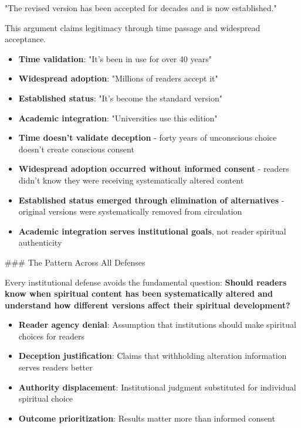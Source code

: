 \documentclass[12pt,twoside]{book}
\begin{document}
"The revised version has been accepted for decades and is now established."

This argument claims legitimacy through time passage and widespread acceptance.

\begin{itemize}
\item \textbf{\textbf{Time validation}}: "It's been in use for over 40 years"
\item \textbf{\textbf{Widespread adoption}}: "Millions of readers accept it"
\item \textbf{\textbf{Established status}}: "It's become the standard version"
\item \textbf{\textbf{Academic integration}}: "Universities use this edition"

\item \textbf{\textbf{Time doesn't validate deception}} - forty years of unconscious choice doesn't create conscious consent
\item \textbf{\textbf{Widespread adoption occurred without informed consent}} - readers didn't know they were receiving systematically altered content
\item \textbf{\textbf{Established status emerged through elimination of alternatives}} - original versions were systematically removed from circulation
\item \textbf{\textbf{Academic integration serves institutional goals}}, not reader spiritual authenticity
\end{itemize}

\#\#\# The Pattern Across All Defenses

Every institutional defense avoids the fundamental question: \textbf{\textbf{\textbf{Should readers know when spiritual content has been systematically altered and understand how different versions affect their spiritual development?}}}

\begin{itemize}
\item \textbf{\textbf{Reader agency denial}}: Assumption that institutions should make spiritual choices for readers
\item \textbf{\textbf{Deception justification}}: Claims that withholding alteration information serves readers better
\item \textbf{\textbf{Authority displacement}}: Institutional judgment substituted for individual spiritual choice
\item \textbf{\textbf{Outcome prioritization}}: Results matter more than informed consent
\end{itemize}
\end{document}
